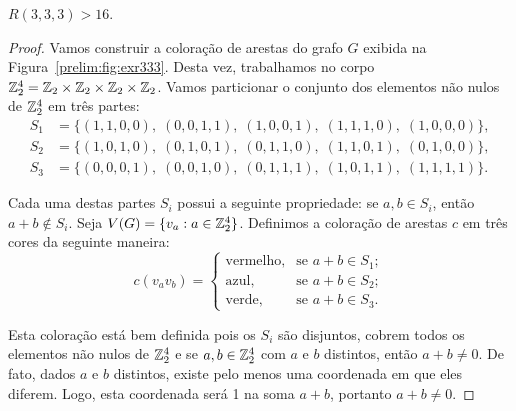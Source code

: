 \begin{proposition}
\label{prelim:thm:exr333}
$R(3,3,3) > 16$.
\end{proposition}
\begin{proof}
Vamos construir a coloração de arestas do grafo $G$ exibida na Figura~\ref{prelim:fig:exr333}. Desta vez, trabalhamos no corpo $\mathbb{Z}_{2}^4 = \mathbb{Z}_{2}\times\mathbb{Z}_{2}\times\mathbb{Z}_{2}\times\mathbb{Z}_{2}$. Vamos particionar o conjunto dos elementos não nulos de $\mathbb{Z}_{2}^4$ em três partes:
\begin{align*}
S_1&=\big\{ (1,1,0,0),\;(0,0,1,1),\;(1,0,0,1),\;(1,1,1,0),\;(1,0,0,0) \big\},\\
S_2&=\big\{ (1,0,1,0),\;(0,1,0,1),\;(0,1,1,0),\;(1,1,0,1),\;(0,1,0,0) \big\},\\
S_3&=\big\{ (0,0,0,1),\;(0,0,1,0),\;(0,1,1,1),\;(1,0,1,1),\;(1,1,1,1) \big\}.
\end{align*}

Cada uma destas partes $S_i$ possui a seguinte propriedade: se $a,b \in S_i$, então $a + b \not\in S_i$. Seja $V(G) = \{v_a : a \in \mathbb{Z}_{2}^4\}$. Definimos a coloração de arestas $c$ em três cores da seguinte maneira:
\[c(v_a v_b) = \begin{cases}
  \text{vermelho}, & \text{se } a + b \in S_1; \\
  \text{azul}, & \text{se } a + b \in S_2; \\
  \text{verde}, & \text{se } a + b \in S_3.
\end{cases}\]

Esta coloração está bem definida pois os $S_i$ são disjuntos, cobrem todos os elementos não nulos de $\mathbb{Z}_{2}^4$ e se $a,b \in \mathbb{Z}_{2}^4$ com $a$ e $b$ distintos, então $a + b \neq 0$. De fato, dados $a$ e $b$ distintos, existe pelo menos uma coordenada em que eles diferem. Logo, esta coordenada será 1 na soma $a+b$, portanto $a + b \neq 0$.


\end{proof}
